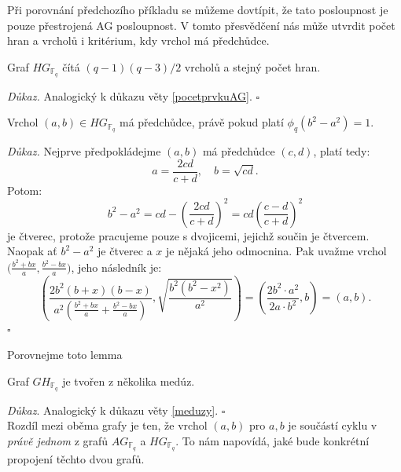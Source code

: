 \documentclass[12pt]{report}
\begin{document}
Při porovnání předchozího příkladu se můžeme dovtípit, že tato posloupnost je pouze přestrojená AG posloupnost. V tomto přesvědčení nás může utvrdit počet hran a vrcholů i kritérium, kdy vrchol má předchůdce.

\begin{veta}
Graf $HG_{\mathbb{F}_q}$ čítá $(q-1)(q-3)/2$ vrcholů a stejný počet hran.
\end{veta}
\textit{Důkaz.} Analogický k důkazu věty \ref{pocetprvkuAG}. \hfill $\square$


\begin{lemma}
Vrchol $(a,b) \in HG_{\mathbb{F}_q}$ má předchůdce, právě pokud platí $\phi_q(b^2-a^2)=1$.
\end{lemma}

\noindent \textit{Důkaz.} Nejprve předpokládejme $(a,b)$ má předchůdce $(c,d)$, platí tedy:
\begin{equation*}
a = \frac{2cd}{c+d}, \quad b = \sqrt{cd}.
\end{equation*}
Potom:
\begin{equation*}
b^2-a^2 = cd- \left(\frac{2 cd}{c+d} \right)^2 = cd \left( \frac{c-d}{c+d} \right)^2
\end{equation*}
je čtverec, protože pracujeme pouze s dvojicemi, jejichž součin je čtvercem. Naopak ať $b^2-a^2$ je čtverec a $x$ je nějaká jeho odmocnina. Pak uvažme vrchol $\Big(\frac{b^2+b  x}{a},\frac{b^2-bx}{a} \Big)$, jeho následník je: $$\left(\frac{2 b^2 (b+x)(b-x)}{a^2 \left(\frac{b^2+bx}{a} + \frac{b^2-bx}{a} \right)}, \sqrt{\frac{b^2(b^2-x^2)}{a^2}} \right)= \left(\frac{2 b^2 \cdot a^2}{2 a \cdot b^2 }, b \right) = \left(a, b \right).$$
 \hfill $\square$

Porovnejme toto lemma 

\begin{dusledek}
Graf $GH_{\mathbb{F}_q}$ je tvořen z několika medúz.
\end{dusledek}
\noindent \textit{Důkaz}. Analogický k důkazu věty \ref{meduzy}. \hfill $\square$\\

Rozdíl mezi oběma grafy je ten, že vrchol $(a,b)$ pro $a,b$ je součástí cyklu v \textit{právě jednom} z grafů $AG_{\mathbb{F}_q}$ a $HG_{\mathbb{F}_q}$. To nám napovídá, jaké bude konkrétní propojení těchto dvou grafů.
\end{document}
